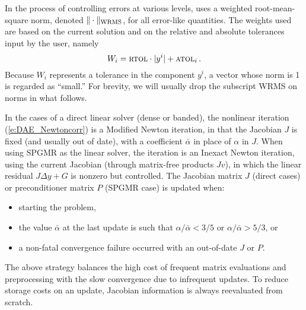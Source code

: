 In the process of controlling errors at various levels, {\ida} uses a
weighted root-mean-square norm, denoted 
$\|\cdot\|_{\mbox{\scriptsize WRMS}}$, for all 
error-like quantities.  The weights used are based on the current
solution and on the relative and absolute tolerances input by the
user, namely
\begin{equation}\label{e:errwt}
 W_i = \mbox{\sc rtol} \cdot |y^i| + \mbox{\sc atol}_i \, .
\end{equation}
Because $W_i$ represents a tolerance in the component $y^i$, a vector
whose norm is 1 is regarded as ``small.''  For brevity, we will
usually drop the subscript WRMS on norms in what follows.

In the cases of a direct linear solver (dense or banded), the nonlinear 
iteration (\ref{e:DAE_Newtoncorr}) is a Modified Newton iteration, in
that the Jacobian $J$ is fixed (and usually out of date), with
a coefficient $\bar\alpha$ in place of $\alpha$ in $J$. When using
SPGMR as the linear solver, the iteration is an Inexact Newton iteration,
using the current Jacobian (through matrix-free products $Jv$), in 
which the linear residual $J\Delta y + G$ is nonzero but controlled.
The Jacobian matrix $J$ (direct cases) or preconditioner matrix $P$ 
(SPGMR case) is updated when:
\begin{itemize}
\item starting the problem,
\item the value $\bar\alpha$ at the last update is such that
  $\alpha / {\bar\alpha} < 3/5$ or $\alpha / {\bar\alpha} > 5/3$, or
\item a non-fatal convergence failure occurred with an out-of-date $J$ or $P$.
\end{itemize}
The above strategy balances the high cost of frequent matrix evaluations
and preprocessing with the slow convergence due to infrequent updates.
To reduce storage costs on an update, Jacobian information is always
reevaluated from scratch.

